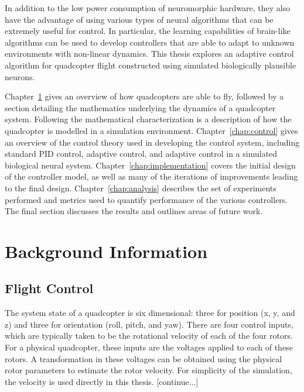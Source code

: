 \documentclass[letterpaper,12pt,titlepage,oneside,final]{book}
\newcommand{\Chapref}[1]{Chapter~\ref{#1}}
\begin{document}
In addition to the low power consumption of neuromorphic hardware, they also have the advantage of using various types of neural algorithms that can be extremely useful for control.
In particular, the learning capabilities of brain-like algorithms can be used to develop controllers that are able to adapt to unknown environments with non-linear dynamics. 
This thesis explores an adaptive control algorithm for quadcopter flight constructed using simulated biologically plausible neurons.

\Chapref{chap:background} gives an overview of how quadcopters are able to fly, followed by a section detailing the mathematics underlying the dynamics of a quadcopter system. 
Following the mathematical characterization is a description of how the quadcopter is modelled in a simulation environment.
\Chapref{chap:control} gives an overview of the control theory used in developing the control system, including standard PID control, adaptive control, and adaptive control in a simulated biological neural system. 
\Chapref{chap:implementation} covers the initial design of the controller model, as well as many of the iterations of improvements leading to the final design.
\Chapref{chap:analysis} describes the set of experiments performed and metrics used to quantify performance of the various controllers. 
The final section discusses the results and outlines areas of future work.

\chapter{Background Information} \label{chap:background}

\section{Flight Control}


The system state of a quadcopter is six dimensional: three for position (x, y, and z) and three for orientation (roll, pitch, and yaw). 
There are four control inputs, which are typically taken to be the rotational velocity of each of the four rotors. 
For a physical quadcopter, these inputs are the voltages applied to each of these rotors.
A transformation in these voltages can be obtained using the physical rotor parameters to estimate the rotor velocity.
For simplicity of the simulation, the velocity is used directly in this thesis. [continue...]
\end{document}
